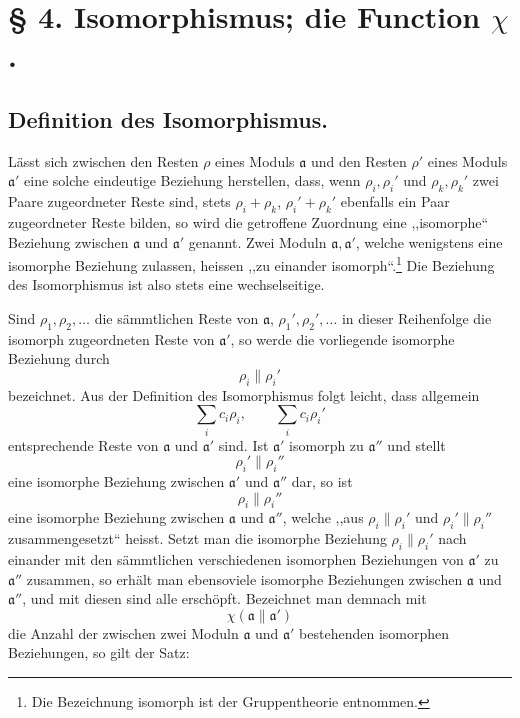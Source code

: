 \section*{§ 4. Isomorphismus; die Function $\chi$.}

\subsection*{Definition des Isomorphismus.}

Lässt sich zwischen den Resten $\rho$ eines Moduls $\mathfrak a$ und den Resten $\rho'$ eines Moduls $\mathfrak a'$ eine solche eindeutige Beziehung herstellen, dass, wenn $\rho_i,\rho_i'$ und $\rho_k,\rho_k'$ zwei Paare zugeordneter Reste sind, stets $\rho_i+\rho_k$, $\rho_i'+\rho_k'$ ebenfalls ein Paar zugeordneter Reste bilden, so wird die getroffene Zuordnung eine ,,isomorphe`` Beziehung zwischen $\mathfrak a$ und $\mathfrak a'$ genannt. Zwei Moduln $\mathfrak a,\mathfrak a'$, welche wenigstens eine isomorphe Beziehung zulassen, heissen ,,zu einander isomorph``.\footnote{Die Bezeichnung isomorph ist der Gruppentheorie entnommen.} Die Beziehung des Isomorphismus ist also stets eine wechselseitige.

Sind $\rho_1,\rho_2,\ldots$ die sämmtlichen Reste von $\mathfrak a$, $\rho_1',\rho_2',\ldots$ in dieser Reihenfolge die isomorph zugeordneten Reste von $\mathfrak a'$, so werde die vorliegende isomorphe Beziehung durch
\[
 \rho_i\parallel \rho_i'
\]
bezeichnet. Aus der Definition des Isomorphismus folgt leicht, dass allgemein
\[
 \sum_i c_i\rho_i,
 \qquad
 \sum_i c_i\rho_i'
\]
entsprechende Reste von $\mathfrak a$ und $\mathfrak a'$ sind. Ist $\mathfrak a'$ isomorph zu $\mathfrak a''$ und stellt
\[
 \rho_i'\parallel \rho_i''
\]
eine isomorphe Beziehung zwischen $\mathfrak a'$ und $\mathfrak a''$ dar, so ist
\[
 \rho_i\parallel \rho_i''
\]
eine isomorphe Beziehung zwischen $\mathfrak a$ und $\mathfrak a''$, welche ,,aus $\rho_i\parallel\rho_i'$ und $\rho_i'\parallel\rho_i''$ zusammengesetzt`` heisst. Setzt man die isomorphe Beziehung $\rho_i\parallel\rho_i'$ nach einander mit den sämmtlichen verschiedenen isomorphen Beziehungen von $\mathfrak a'$ zu $\mathfrak a''$ zusammen, so erhält man ebensoviele isomorphe Beziehungen zwischen $\mathfrak a$ und $\mathfrak a''$, und mit diesen sind alle erschöpft. Bezeichnet man demnach mit
\[
 \chi(\mathfrak a\parallel\mathfrak a')
\]
die Anzahl der zwischen zwei Moduln $\mathfrak a$ und $\mathfrak a'$ bestehenden isomorphen Beziehungen, so gilt der Satz:


